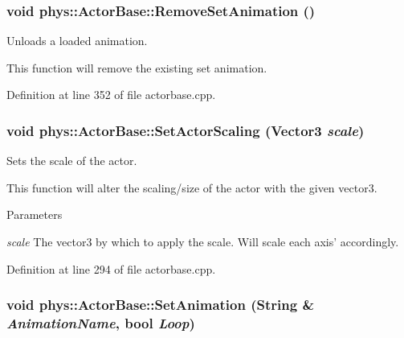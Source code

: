 \hypertarget{classphys_1_1ActorBase_ac42e5e47504d7f296bb0a2bedc2ded07}{
\subsubsection[{RemoveSetAnimation}]{\setlength{\rightskip}{0pt plus 5cm}void phys::ActorBase::RemoveSetAnimation ()}}
\label{d8/d0f/classphys_1_1ActorBase_ac42e5e47504d7f296bb0a2bedc2ded07}


Unloads a loaded animation. 

This function will remove the existing set animation. 

Definition at line 352 of file actorbase.cpp.

\hypertarget{classphys_1_1ActorBase_a1ac7c692d7f88f39ebb1c1db5deba251}{
\subsubsection[{SetActorScaling}]{\setlength{\rightskip}{0pt plus 5cm}void phys::ActorBase::SetActorScaling ({\bf Vector3} {\em scale})}}
\label{d8/d0f/classphys_1_1ActorBase_a1ac7c692d7f88f39ebb1c1db5deba251}


Sets the scale of the actor. 

This function will alter the scaling/size of the actor with the given vector3. 
\begin{DoxyParams}{Parameters}
\item[{\em scale}]The vector3 by which to apply the scale. Will scale each axis' accordingly. \end{DoxyParams}


Definition at line 294 of file actorbase.cpp.

\hypertarget{classphys_1_1ActorBase_a708ec161f50833323294aa7ddceee776}{
\subsubsection[{SetAnimation}]{\setlength{\rightskip}{0pt plus 5cm}void phys::ActorBase::SetAnimation ({\bf String} \& {\em AnimationName}, \/  bool {\em Loop})}}
\label{d8/d0f/classphys_1_1ActorBase_a708ec161f50833323294aa7ddceee776}


